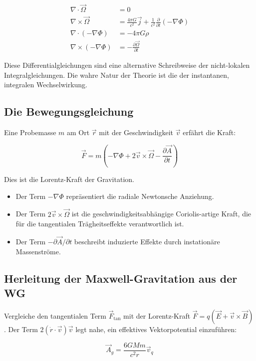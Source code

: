 \documentclass[12pt,a4paper]{article}
\begin{document}
\begin{align}
\nabla \cdot \vec{\Omega} &= 0 \\
\nabla \times \vec{\Omega} &= \frac{4\pi G}{c^2} \vec{j} + \frac{1}{c^2} \frac{\partial}{\partial t} (-\nabla \Phi) \\
\nabla \cdot (-\nabla \Phi) &= -4\pi G\rho \\
\nabla \times (-\nabla \Phi) &= -\frac{\partial \vec{\Omega}}{\partial t}
\end{align}

Diese Differentialgleichungen sind eine alternative Schreibweise der nicht-lokalen Integralgleichungen. Die wahre Natur der Theorie ist die der instantanen, integralen Wechselwirkung.

\subsection{Die Bewegungsgleichung}

Eine Probemasse $m$ am Ort $\vec{r}$ mit der Geschwindigkeit $\vec{v}$ erfährt die Kraft:

\begin{equation}
\vec{F} = m \left( -\nabla \Phi + 2\vec{v} \times \vec{\Omega} - \frac{\partial \vec{A}}{\partial t} \right)
\end{equation}

Dies ist die Lorentz-Kraft der Gravitation.
\begin{itemize}
\item Der Term $-\nabla\Phi$ repräsentiert die radiale Newtonsche Anziehung.
\item Der Term $2\vec{v} \times \vec{\Omega}$ ist die geschwindigkeitsabhängige Coriolis-artige Kraft, die für die tangentialen Trägheitseffekte verantwortlich ist.
\item Der Term $-\partial\vec{A}/\partial t$ beschreibt induzierte Effekte durch instationäre Massenströme.
\end{itemize}

\subsection{Herleitung der Maxwell-Gravitation aus der WG}

Vergleiche den tangentialen Term $\vec{F}_{\text{tan}}$ mit der Lorentz-Kraft $\vec{F} = q(\vec{E} + \vec{v} \times \vec{B})$. Der Term $2(\dot{r} \cdot \vec{v})\vec{v}$ legt nahe, ein effektives Vektorpotential einzuführen:

\begin{equation}
\vec{A}_g = \frac{6GMm}{c^2r} \vec{v}_q
\end{equation}
\end{document}
